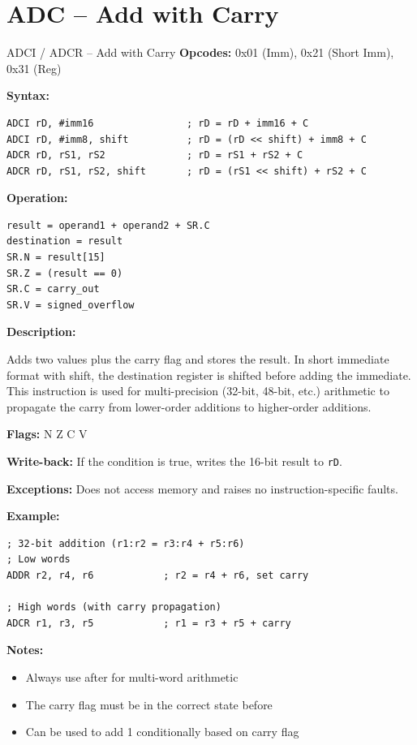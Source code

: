 \section{ADC -- Add with Carry}

\begin{instructionbox}{ADCI / ADCR -- Add with Carry}
	\textbf{Opcodes:} 0x01 (Imm), 0x21 (Short Imm), 0x31 (Reg)

	\textbf{Syntax:}
	\begin{lstlisting}
ADCI rD, #imm16                ; rD = rD + imm16 + C
ADCI rD, #imm8, shift          ; rD = (rD << shift) + imm8 + C
ADCR rD, rS1, rS2              ; rD = rS1 + rS2 + C
ADCR rD, rS1, rS2, shift       ; rD = (rS1 << shift) + rS2 + C
\end{lstlisting}

	\textbf{Operation:}
	\begin{verbatim}
result = operand1 + operand2 + SR.C
destination = result
SR.N = result[15]
SR.Z = (result == 0)
SR.C = carry_out
SR.V = signed_overflow
\end{verbatim}

	\textbf{Description:}

	Adds two values plus the carry flag and stores the result. In short immediate format with shift, the destination
	register is shifted before adding the immediate. This instruction is used for multi-precision (32-bit, 48-bit, etc.)
	arithmetic to propagate the carry from lower-order additions to higher-order additions.

	\textbf{Flags:} N Z C V

	\textbf{Write-back:} If the condition is true, writes the 16-bit result to \texttt{rD}.

	\textbf{Exceptions:} Does not access memory and raises no instruction-specific faults.

	\textbf{Example:}
	\begin{lstlisting}
; 32-bit addition (r1:r2 = r3:r4 + r5:r6)
; Low words
ADDR r2, r4, r6            ; r2 = r4 + r6, set carry

; High words (with carry propagation)
ADCR r1, r3, r5            ; r1 = r3 + r5 + carry
\end{lstlisting}

	\textbf{Notes:}
	\begin{itemize}
		\item Always use after  for multi-word arithmetic
		\item The carry flag must be in the correct state before 
		\item Can be used to add 1 conditionally based on carry flag
	\end{itemize}
\end{instructionbox}

